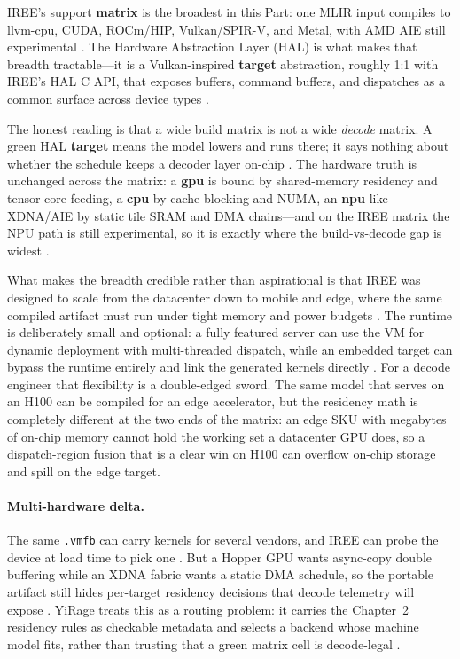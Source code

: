 IREE's support \textbf{matrix} is the broadest in this Part: one MLIR input compiles to llvm-cpu, CUDA, ROCm/HIP, Vulkan/SPIR-V, and Metal, with AMD AIE still experimental \citep{iree2024}. The Hardware Abstraction Layer (HAL) is what makes that breadth tractable---it is a Vulkan-inspired \textbf{target} abstraction, roughly 1:1 with IREE's HAL C API, that exposes buffers, command buffers, and dispatches as a common surface across device types \citep{iree2024}.

The honest reading is that a wide build matrix is not a wide \emph{decode} matrix. A green HAL \textbf{target} means the model lowers and runs there; it says nothing about whether the schedule keeps a decoder layer on-chip \citep{taxbreak2026,memoryfloor2026}. The hardware truth is unchanged across the matrix: a \textbf{gpu} is bound by shared-memory residency and tensor-core feeding, a \textbf{cpu} by cache blocking and NUMA, an \textbf{npu} like XDNA/AIE by static tile SRAM and DMA chains---and on the IREE matrix the NPU path is still experimental, so it is exactly where the build-vs-decode gap is widest \citep{nvidia2022hopper,amd2024xdna,amd2024aie}.

What makes the breadth credible rather than aspirational is that IREE was designed to scale from the datacenter down to mobile and edge, where the same compiled artifact must run under tight memory and power budgets \citep{iree2024}. The runtime is deliberately small and optional: a fully featured server can use the VM for dynamic deployment with multi-threaded dispatch, while an embedded target can bypass the runtime entirely and link the generated kernels directly \citep{iree2024}. For a decode engineer that flexibility is a double-edged sword. The same model that serves on an H100 can be compiled for an edge accelerator, but the residency math is completely different at the two ends of the matrix: an edge SKU with megabytes of on-chip memory cannot hold the working set a datacenter GPU does, so a dispatch-region fusion that is a clear win on H100 can overflow on-chip storage and spill on the edge target.

\paragraph{Multi-hardware delta.} The same \texttt{.vmfb} can carry kernels for several vendors, and IREE can probe the device at load time to pick one \citep{iree2024}. But a Hopper GPU wants async-copy double buffering while an XDNA fabric wants a static DMA schedule, so the portable artifact still hides per-target residency decisions that decode telemetry will expose \citep{semianalysis2024tma,amd2024aie}. YiRage treats this as a routing problem: it carries the Chapter~2 residency rules as checkable metadata and selects a backend whose machine model fits, rather than trusting that a green matrix cell is decode-legal \citep{yirage2026}.

